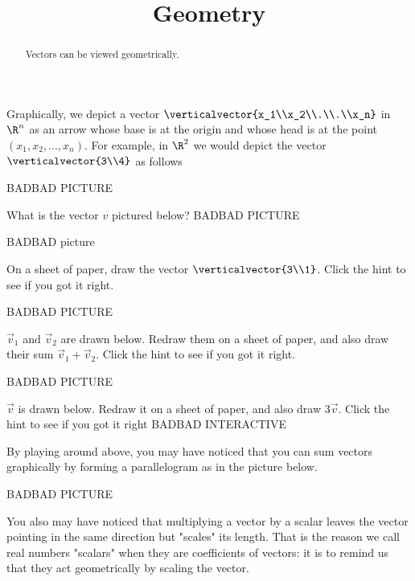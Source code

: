 \documentclass{ximera}
\title{Geometry}
\begin{document}
\begin{abstract}
  Vectors can be viewed geometrically.
\end{abstract}

	Graphically, we depict a vector $\verticalvector{x_1\\x_2\\.\\.\\x_n}$ in $\R^n$ as an arrow whose base is at the origin and whose head is at  the point $(x_1,x_2,...,x_n)$.  
	For example, in $\R^2$ we would depict the vector $\verticalvector{3\\4}$ as follows
 	 
 	 BADBAD PICTURE
 	 
 	 \begin{question}
 	 	What is the vector $v$ pictured below?
 	 	BADBAD PICTURE
  	 \end{question}
  	 
  	 \begin{question}
  	 	\begin{hint}
  	 		BADBAD picture
  	 	\end{hint}
  	 	On a sheet of paper, draw the vector $\verticalvector{3\\1}$. Click the hint to see if you got it right.
  	 \end{question}
  	 
  	 \begin{question}
  	 \begin{hint}
  	 	BADBAD PICTURE
  	 \end{hint}
  	 	 $\vec{v}_1$ and $\vec{v}_2$ are drawn below.  Redraw them on a sheet of paper, and also draw their sum $\vec{v}_1+\vec{v}_2$.
  	 	 Click the hint to see if you got it right.
  	 	
  	 \end{question}
  	 
  	 \begin{question}
  	 \begin{hint}
  	 BADBAD PICTURE
  	 \end{hint}
  	 	$\vec{v}$ is drawn below.  Redraw it on a sheet of paper, and also draw $3\vec{v}$.  Click the hint to see if you got it right
  	 	BADBAD INTERACTIVE
  	 \end{question}
  	 
  	 
  		By playing around above, you may have noticed that you can sum vectors graphically by forming a parallelogram as in the picture below.
  		
  		BADBAD PICTURE
  		
  		You also may have noticed that multiplying a vector by a scalar leaves the vector pointing in the same direction but "scales" its length.  That is the reason we call real
  		numbers  "scalars" when they are coefficients of vectors:  it is to remind us that they act geometrically by scaling the vector.
\end{document}

